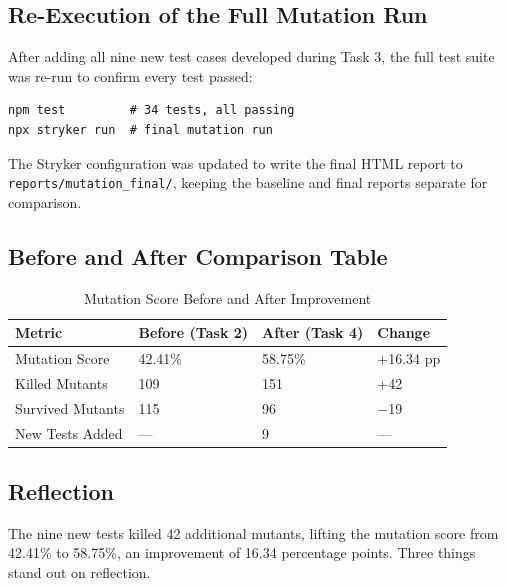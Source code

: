 \documentclass[12pt, a4paper]{article}
\begin{document}
\subsection{Re-Execution of the Full Mutation Run}

After adding all nine new test cases developed during Task 3, the full test suite was re-run to confirm every test passed:

\begin{lstlisting}[caption={Re-run commands}]
npm test         # 34 tests, all passing
npx stryker run  # final mutation run
\end{lstlisting}

The Stryker configuration was updated to write the final HTML report to \texttt{reports/mutation\_final/}, keeping the baseline and final reports separate for comparison.

\subsection{Before and After Comparison Table}

\begin{table}[h!]
\centering
\begin{tabular}{llll}
\toprule
\textbf{Metric}     & \textbf{Before (Task 2)} & \textbf{After (Task 4)} & \textbf{Change} \\
\midrule
Mutation Score      & 42.41\%                  & 58.75\%                 & +16.34 pp       \\
Killed Mutants      & 109                      & 151                     & +42             \\
Survived Mutants    & 115                      & 96                      & $-$19           \\
New Tests Added     & ---                      & 9                       & ---             \\
\bottomrule
\end{tabular}
\caption{Mutation Score Before and After Improvement}
\end{table}

\subsection{Reflection}

The nine new tests killed 42 additional mutants, lifting the mutation score from 42.41\% to 58.75\%, an improvement of 16.34 percentage points. Three things stand out on reflection.
\end{document}
